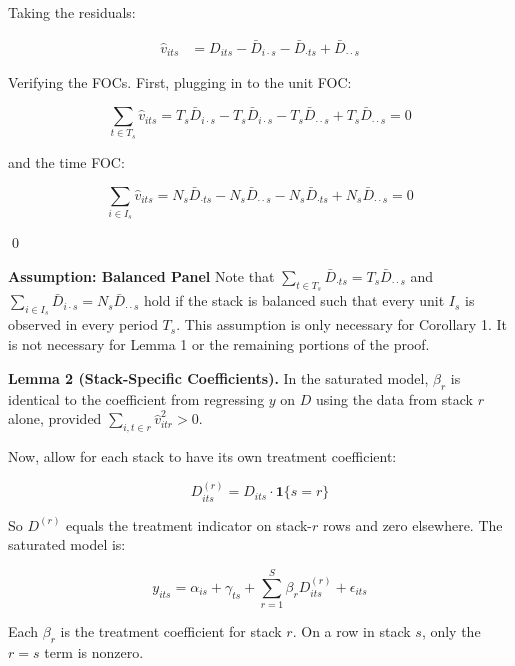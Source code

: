 \documentclass[12pt]{article}
\begin{document}
Taking the residuals:

\begin{align*}
    \hat{v}_{its} &= D_{its} - \bar{D}_{i \cdot s} - \bar{D}_{\cdot t s} + \bar{D}_{\cdot \cdot s}
\end{align*}

Verifying the FOCs. First, plugging in to the unit FOC:

\begin{equation*}
    \sum_{t \in  T_s} \hat{v}_{its} = T_s\bar{D}_{i \cdot s} - T_s\bar{D}_{i \cdot s} - T_s\bar{D}_{\cdot \cdot s} + T_s\bar{D}_{\cdot \cdot s} = 0
\end{equation*}

and the time FOC:

\begin{equation*}
    \sum_{i \in I_s} \hat{v}_{its} = N_s \bar{D}_{\cdot t s} - N_s \bar{D}_{\cdot \cdot s} - N_s \bar{D}_{\cdot t s} + N_s \bar{D}_{\cdot \cdot s} = 0
\end{equation*}

\qed

\textbf{Assumption: Balanced Panel} Note that $\sum_{t \in T_s} \bar{D}_{\cdot ts} = T_s \bar{D}_{\cdot \cdot s}$ and $\sum_{i \in I_s} \bar{D}_{i \cdot s} = N_s \bar{D}_{\cdot \cdot s}$ hold if the stack is balanced such that every unit $I_s$ is observed in every period $T_s$. This assumption is only necessary for Corollary 1. It is not necessary for Lemma 1 or the remaining portions of the proof.

\textbf{Lemma 2 (Stack-Specific Coefficients).} In the saturated model, $\hat{\beta}_r$ is identical to the coefficient from regressing $y$ on $D$ using the data from stack $r$ alone, provided $\sum_{i,t \in r} \hat{v}_{itr}^2 > 0$.

Now, allow for each stack to have its own treatment coefficient:

\begin{equation*}
    D_{its}^{(r)} = D_{its} \cdot \mathbf{1}\{s = r\}
\end{equation*}

So $D^{(r)}$ equals the treatment indicator on stack-$r$ rows and zero elsewhere. The saturated model is:

\begin{equation*}
    y_{its} = \alpha_{is} + \gamma_{ts} + \sum_{r = 1}^S \beta_r D_{its}^{(r)} + \epsilon_{its}
\end{equation*}

Each $\beta_r$ is the treatment coefficient for stack $r$. On a row in stack $s$, only the $r = s$ term is nonzero.
\end{document}
